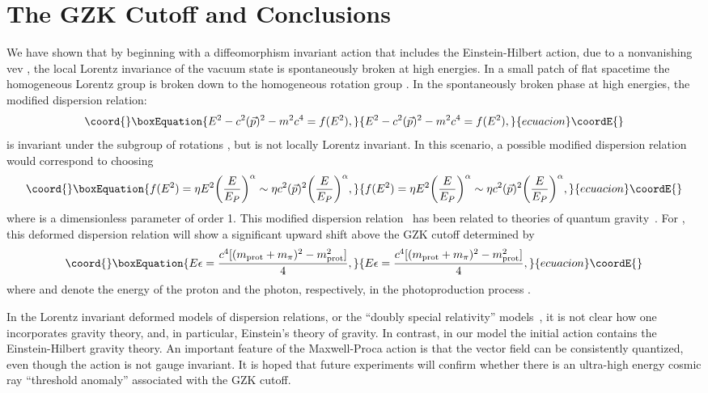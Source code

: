 \documentclass[a4paper,12pt]{article}
\begin{document}
{\section{\bf The GZK Cutoff and Conclusions}

We have shown that by beginning with a diffeomorphism invariant action that includes
the Einstein-Hilbert action, due to a nonvanishing vev
\coordHE{}, the local Lorentz invariance of the vacuum state is
spontaneously broken at high energies. In a small patch of flat spacetime the
homogeneous Lorentz group \coordHE{} is broken down to the homogeneous rotation group
\coordHE{}. In the spontaneously broken phase at high energies, the modified dispersion
relation:
\begin{equation}\coord{}\boxEquation{
E^2-c^2({\vec p})^2-m^2c^4=f(E^2),
}{
E^2-c^2({\vec p})^2-m^2c^4=f(E^2),
}{ecuacion}\coordE{}\end{equation}
is invariant under the subgroup of rotations \coordHE{}, but is not locally
Lorentz invariant. In this scenario, a possible modified dispersion relation would
correspond to choosing
\begin{equation}\coord{}\boxEquation{
f(E^2)=\eta E^2\biggl(\frac{E}{E_P}\biggr)^\alpha\sim \eta c^2({\vec
p})^2\biggl(\frac{E}{E_P}\biggr)^\alpha,
}{
f(E^2)=\eta E^2\biggl(\frac{E}{E_P}\biggr)^\alpha\sim \eta c^2({\vec
p})^2\biggl(\frac{E}{E_P}\biggr)^\alpha,
}{ecuacion}\coordE{}\end{equation}
where \myHighlight{$\eta$}\coordHE{} is a dimensionless parameter of order 1. This modified dispersion
relation~\cite{Camelia,Piran} has been
related to theories of quantum gravity~\cite{Camelia,Smolin,Kifune}. For
\coordHE{}, this deformed dispersion relation will show a significant upward
shift above the GZK cutoff determined by
\begin{equation}\coord{}\boxEquation{
E\epsilon=\frac{c^4[(m_{\rm prot}+m_\pi)^2-m^2_{\rm prot}]}{4},
}{
E\epsilon=\frac{c^4[(m_{\rm prot}+m_\pi)^2-m^2_{\rm prot}]}{4},
}{ecuacion}\coordE{}\end{equation}
where \coordHE{} and \myHighlight{$\epsilon$}\coordHE{} denote the energy of the proton and the photon,
respectively, in the photoproduction process \coordHE{}.

In the Lorentz invariant deformed models of dispersion relations, or the ``doubly
special relativity'' models~\cite{Camelia2}, it is not clear how one incorporates
gravity theory, and, in particular, Einstein's theory of gravity.  In contrast, in
our model the initial action contains the Einstein-Hilbert gravity theory. An
important feature of the Maxwell-Proca action \coordHE{} is that the vector field
\myHighlight{$\phi^\mu$}\coordHE{} can be consistently quantized, even though the action is not gauge
invariant. It is hoped that future experiments will confirm whether there is an
ultra-high energy cosmic ray ``threshold anomaly'' associated with the GZK cutoff.

}
\end{document}
